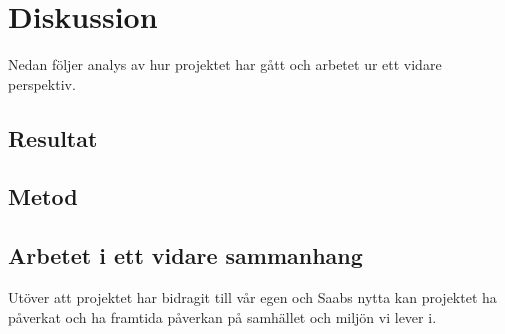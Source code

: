 \section{Diskussion}
Nedan följer analys av hur projektet har gått och arbetet ur ett vidare perspektiv.  

\subsection{Resultat}

\subsection{Metod}

\subsection{Arbetet i ett vidare sammanhang}
Utöver att projektet har bidragit till vår egen och Saabs nytta kan projektet ha påverkat och ha framtida påverkan på samhället och miljön vi lever i.  

